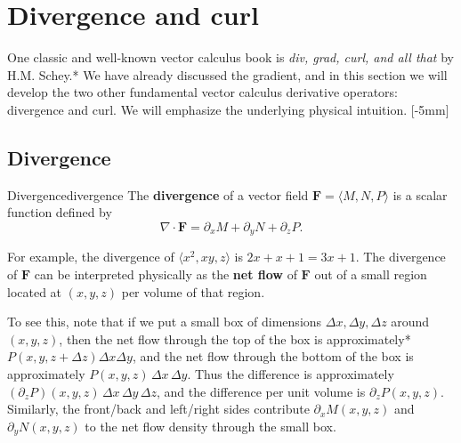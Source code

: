\documentclass[prettycode,shellescape]{watsonbook}
\begin{document}
\section{Divergence and curl} \label{sec:divcurl} 

One classic and well-known vector calculus book is \textit{div, grad,
  curl, and all that} by H.M. Schey.* We have already discussed the
gradient, and in this section we will develop the two other
fundamental vector calculus derivative operators: divergence and
curl. We will emphasize the underlying physical intuition. [-5mm]

\subsection{Divergence}


\begin{defn}{Divergence}{divergence}
  The \textbf{divergence} of a vector field
  $\mathbf{F} = \langle M, N, P \rangle$ is a scalar function defined
  by
  \[
    \nabla \cdot \mathbf{F} = \partial_x M  +\partial _y N + \partial_z
    P. 
  \]
\end{defn}

For example, the divergence of $\langle x^2, xy, z \rangle$ is
$2x + x + 1 = 3x + 1$. The divergence of $\mathbf{F}$ can be
interpreted physically as the \textbf{net flow} of $\mathbf{F}$ out of
a small region located at $(x,y,z)$ per volume of that region. 

To see this, note that if we put a small box of dimensions $\Delta x, \Delta y, \Delta z$
around $(x,y,z)$, then the net flow through the top of the box is
approximately* $P(x,y,z+\Delta z)\Delta x \Delta y$, and the net flow
through the bottom of the box is approximately
$P(x, y, z)\, \Delta x \,\Delta y$. Thus the difference is approximately
$(\partial_z P)(x,y,z) \, \Delta x \,  \Delta y \, \Delta z$, and the
difference per unit volume is $\partial_z P(x,y,z)$. Similarly, the front/back
and left/right sides contribute $\partial_x M(x,y,z)$ and $\partial_y N(x,y,z)$ to the net flow density through the small box.
\end{document}
